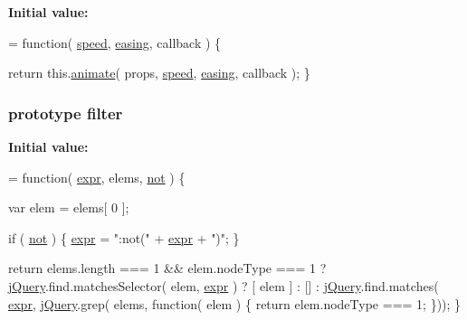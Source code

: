 {\bfseries Initial value\-:}
\begin{DoxyCode}
= \textcolor{keyword}{function}( \hyperlink{jquery-1_810_82-vsdoc_8js_add98c90065e6563cba26ff6d2016c46c}{speed}, \hyperlink{jquery-1_810_82-vsdoc_8js_a9758a312629fa6de1744280dd6e6253b}{easing}, callback ) \{


        \textcolor{keywordflow}{return} this.\hyperlink{jquery-1_810_82-vsdoc_8js_a956a1d08128d41115c45b6815814a64d}{animate}( props, \hyperlink{jquery-1_810_82-vsdoc_8js_add98c90065e6563cba26ff6d2016c46c}{speed}, \hyperlink{jquery-1_810_82-vsdoc_8js_a9758a312629fa6de1744280dd6e6253b}{easing}, callback );
    \}
\end{DoxyCode}
\hypertarget{jquery-1_810_82-vsdoc_8js_ac99d0cf56cab46114f5765a14e03ad6d}{
\subsubsection[{filter}]{ {\bf prototype} filter}}\label{jquery-1_810_82-vsdoc_8js_ac99d0cf56cab46114f5765a14e03ad6d}
{\bfseries Initial value\-:}
\begin{DoxyCode}
= \textcolor{keyword}{function}( \hyperlink{jquery-1_810_82-vsdoc_8js_aaacd1d5b3593ba4dfff6d67d4f6cfda1}{expr}, elems, \hyperlink{jquery-1_810_82-vsdoc_8js_a78ab1ea877c73295e1e4cd1002ad38c7}{not} ) \{

        var elem = elems[ 0 ];

        \textcolor{keywordflow}{if} ( \hyperlink{jquery-1_810_82-vsdoc_8js_a78ab1ea877c73295e1e4cd1002ad38c7}{not} ) \{
            \hyperlink{jquery-1_810_82-vsdoc_8js_aaacd1d5b3593ba4dfff6d67d4f6cfda1}{expr} = \textcolor{stringliteral}{":not("} + \hyperlink{jquery-1_810_82-vsdoc_8js_aaacd1d5b3593ba4dfff6d67d4f6cfda1}{expr} + \textcolor{stringliteral}{")"};
        \}

        \textcolor{keywordflow}{return} elems.length === 1 && elem.nodeType === 1 ?
            \hyperlink{jquery-1_810_82-vsdoc_8js_add5237586d970a38a81f990e8eb28c6c}{jQuery}.find.matchesSelector( elem, \hyperlink{jquery-1_810_82-vsdoc_8js_aaacd1d5b3593ba4dfff6d67d4f6cfda1}{expr} ) ? [ elem ] : [] :
            \hyperlink{jquery-1_810_82-vsdoc_8js_add5237586d970a38a81f990e8eb28c6c}{jQuery}.find.matches( \hyperlink{jquery-1_810_82-vsdoc_8js_aaacd1d5b3593ba4dfff6d67d4f6cfda1}{expr}, \hyperlink{jquery-1_810_82-vsdoc_8js_add5237586d970a38a81f990e8eb28c6c}{jQuery}.grep( elems, \textcolor{keyword}{function}( elem ) \{
                \textcolor{keywordflow}{return} elem.nodeType === 1;
            \}));
    \}
\end{DoxyCode}
